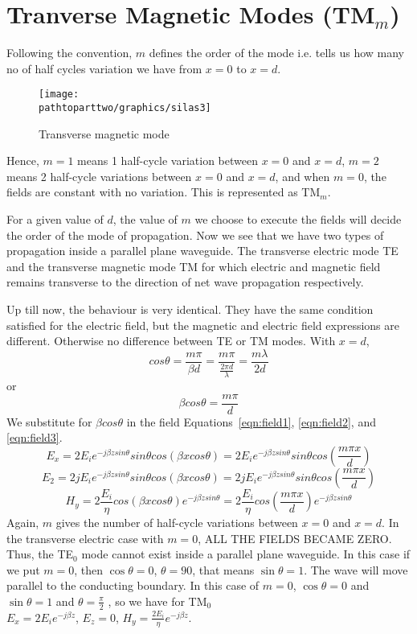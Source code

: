 \section{Tranverse Magnetic  Modes (TM$_m$)}
 Following the convention, $m$ defines the order of the mode i.e. tells us how many no of half cycles variation we have from $x = 0$ to $x = d$.
\begin{figure}[h]
\centering
\texttt{[image: \\pathtoparttwo/graphics/silas3]}
\caption{Transverse magnetic  mode}
\end{figure}
Hence, $ m = 1$ means 1 half-cycle variation between $x = 0$ and $x = d$, $m = 2$ means 2 half-cycle variations between $x = 0$ and $x = d$, and when $m = 0$, the fields are constant with no variation. This is represented as TM$_m$. 

For a given value of $d$, the value of $m$ we choose to execute the fields will decide the order of the mode of propagation. Now we see that we have two types of propagation inside a parallel plane waveguide. The transverse electric mode TE and the transverse magnetic mode TM for which electric and magnetic field remains transverse to the direction of net wave propagation respectively. 

Up till now, the behaviour is very identical. They have the same condition satisfied for the electric field, but the magnetic and electric field expressions are different. Otherwise no difference between TE or TM modes. With $x = d$,
\begin{dmath*}
cos\theta = \frac{m \pi}{\beta d} =\frac{m \pi}{\frac{2\pi d}{\lambda}} = \frac{m\lambda}{2d}
\end{dmath*} 
or
\begin{dmath*}
\beta cos\theta = \frac{m \pi}{d}
\end{dmath*}
We substitute for $\beta cos\theta$ in the field Equations~\ref{eqn:field1}, \ref{eqn:field2}, and \ref{eqn:field3}.
\begin{dmath}
E_{x} = 2 E_{i} e^{-j\beta zsin\theta} sin\theta cos(\beta xcos\theta) = 2 E_{i} e^{-j\beta zsin\theta} sin\theta cos(\frac{m\pi x}{d})
\end{dmath}
\begin{dmath}
E_{2} = 2 jE_{i} e^{-j\beta zsin\theta} sin\theta cos(\beta xcos\theta) = 2 jE_{i} e^{-j\beta zsin\theta} sin\theta cos(\frac{m\pi x}{d})
\end{dmath}
\begin{dmath}
H_{y} = 2 \frac{E_{i}}{\eta} cos(\beta xcos\theta) e^{-j\beta zsin\theta} =2 \frac{E_{i}}{\eta} cos(\frac{m\pi x}{d}) e^{-j\beta zsin\theta} 
\end{dmath}
Again, $m$ gives the number of half-cycle variations between $x = 0$ and $x = d$. In the transverse electric case with $m = 0$, ALL THE FIELDS BECAME ZERO. Thus, the TE$_0$ mode cannot exist inside a parallel plane waveguide. In this case if we put $m = 0$, then $\cos\theta =0$, $\theta =90$, that means $\sin\theta =1$. The wave will move parallel to the conducting boundary. In this case of $m = 0$, $\cos\theta =0$ and $\sin\theta =1$ and $\theta=\frac{\pi}{2}$ , so we have for TM$_0$\\ 
$E_{x} =2E_{i} e^{-j\beta z}$, $E_{z}= 0$, $H_{y} =\frac{2E_{i}}{\eta} e^{-j\beta z}$.

